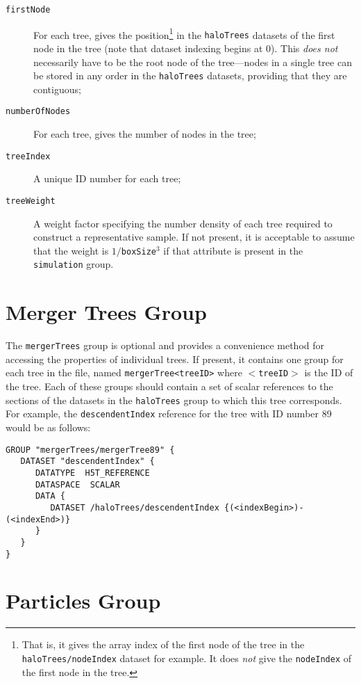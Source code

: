 \begin{description}
 \item [{\tt firstNode}] For each tree, gives the position\footnote{That is, it gives the array index of the first node of the tree in the {\tt haloTrees/nodeIndex} dataset for example. It does \emph{not} give the {\tt nodeIndex} of the first node in the tree.} in the {\tt haloTrees} datasets of the first node in the tree (note that dataset indexing begins at 0). This \emph{does not} necessarily have to be the root node of the tree---nodes in a single tree can be stored in any order in the {\tt haloTrees} datasets, providing that they are contiguous;
 \item [{\tt numberOfNodes}] For each tree, gives the number of nodes in the tree;
 \item [{\tt treeIndex}] A unique ID number for each tree;
 \item [{\tt treeWeight}] A weight factor specifying the number density of each tree required to construct a representative sample. If not present, it is acceptable to assume that the weight is $1/${\tt boxSize}$^3$ if that attribute is present in the {\tt simulation} group.
\end{description}

\section{Merger Trees Group}

The {\tt mergerTrees} group is optional and provides a convenience method for accessing the properties of individual trees. If present, it contains one group for each tree in the file, named {\tt mergerTree<treeID>} where {\tt $<$treeID$>$} is the ID of the tree. Each of these groups should contain a set of scalar references to the sections of the datasets in the {\tt haloTrees} group to which this tree corresponds. For example, the {\tt descendentIndex} reference for the tree with ID number 89 would be as follows:

\begin{verbatim}
GROUP "mergerTrees/mergerTree89" {
   DATASET "descendentIndex" {
      DATATYPE  H5T_REFERENCE
      DATASPACE  SCALAR
      DATA {
         DATASET /haloTrees/descendentIndex {(<indexBegin>)-(<indexEnd>)}
      }
   }
}
\end{verbatim}

\section{Particles Group}

